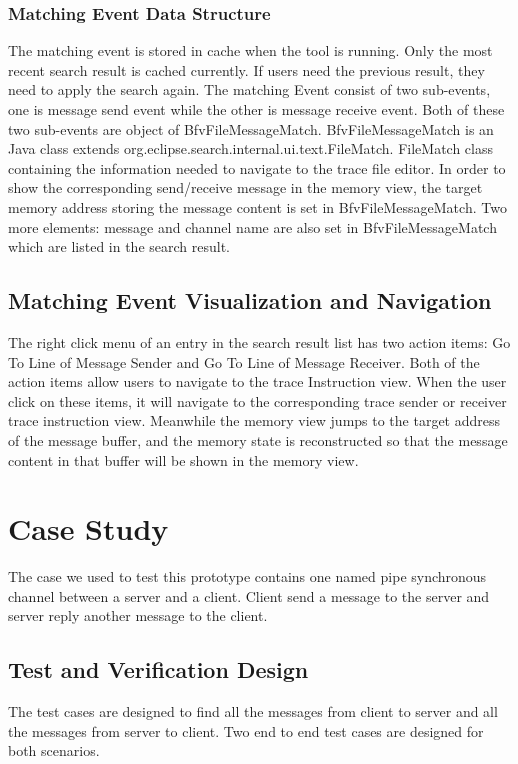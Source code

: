 \documentclass[paper=a4, fontsize=11pt]{scrartcl}
\numberwithin{equation}{section}		%
\numberwithin{figure}{section}			%
\numberwithin{table}{section}				%
\begin{document}
\subsubsection{Matching Event Data Structure}
The matching event is stored in cache when the tool is running. Only the most recent search result is cached currently. If users need the previous result, they need to apply the search again. The matching Event consist of two sub-events, one is message send event while the other is message receive event. Both of these two sub-events are object of BfvFileMessageMatch. BfvFileMessageMatch is an Java class extends org.eclipse.search.internal.ui.text.FileMatch. FileMatch class containing the information needed to navigate to the trace file editor. In order to show the corresponding send/receive message in the memory view, the target memory address storing the message content is set in BfvFileMessageMatch. Two more elements: message and channel name are also set in BfvFileMessageMatch which are listed in the search result. 

\subsection{Matching Event Visualization and Navigation}
The right click menu of an entry in the search result list has two action items: Go To Line of Message Sender and Go To Line of Message Receiver. Both of the action items allow users to navigate to the trace Instruction view. When the user click on these items, it will navigate to the corresponding trace sender or receiver trace instruction view.  Meanwhile the memory view jumps to the target address of the message buffer, and the memory state is reconstructed so that the message content in that buffer will be shown in the memory view.


\section{Case Study}
The case we used to test this prototype contains one named pipe synchronous channel between a server and a client. Client send a message to the server and server reply another message to the client. 
\subsection{Test and Verification Design}
The test cases are designed to find all the messages from client to server and all the messages from server to client. Two end to end test cases are designed for both scenarios. 
\end{document}
